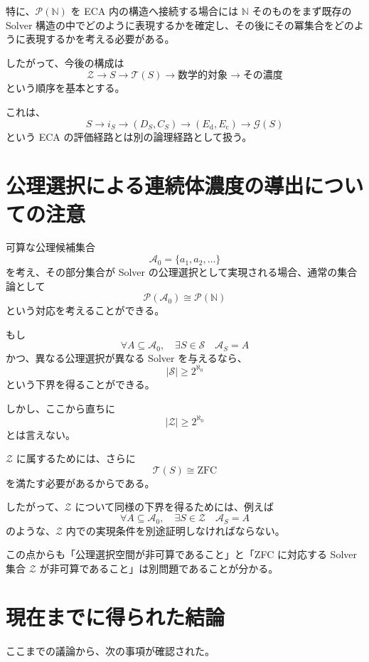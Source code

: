 \documentclass[a4paper,11pt]{article}
\begin{document}
特に、$\mathcal{P}(\mathbb{N})$ を ECA 内の構造へ接続する場合には $\mathbb{N}$ そのものをまず既存の Solver 構造の中でどのように表現するかを確定し、その後にその冪集合をどのように表現するかを考える必要がある。

したがって、今後の構成は
\[
\boxed{
\mathcal{Z}
\longrightarrow
S
\longrightarrow
\mathcal{T}(S)
\longrightarrow
\text{数学的対象}
\longrightarrow
\text{その濃度}
}
\]
という順序を基本とする。

これは、
\[
S
\longrightarrow
i_S
\longrightarrow
(D_S,C_S)
\longrightarrow
(E_{\mathrm d},E_{\mathrm c})
\longrightarrow
\mathcal{G}(S)
\]
という ECA の評価経路とは別の論理経路として扱う。

\section{公理選択による連続体濃度の導出についての注意}

可算な公理候補集合
\[
\mathcal{A}_0=\{a_1,a_2,\ldots\}
\]
を考え、その部分集合が Solver の公理選択として実現される場合、通常の集合論として
\[
\mathcal{P}(\mathcal{A}_0)
\cong
\mathcal{P}(\mathbb{N})
\]
という対応を考えることができる。

もし
\[
\forall A\subseteq\mathcal{A}_0,\quad
\exists S\in\mathcal{S}
\quad
\mathcal{A}_S=A
\]
かつ、異なる公理選択が異なる Solver を与えるなら、
\[
|\mathcal{S}|
\geq
2^{\aleph_0}
\]
という下界を得ることができる。

しかし、ここから直ちに
\[
|\mathcal{Z}|
\geq
2^{\aleph_0}
\]
とは言えない。

$\mathcal{Z}$ に属するためには、さらに
\[
\mathcal{T}(S)\cong\mathrm{ZFC}
\]
を満たす必要があるからである。

したがって、$\mathcal{Z}$ について同様の下界を得るためには、例えば
\[
\boxed{
\forall A\subseteq\mathcal{A}_0,\quad
\exists S\in\mathcal{Z}
\quad
\mathcal{A}_S=A
}
\]
のような、$\mathcal{Z}$ 内での実現条件を別途証明しなければならない。

この点からも「公理選択空間が非可算であること」と「ZFC に対応する Solver 集合 $\mathcal{Z}$ が非可算であること」は別問題であることが分かる。

\section{現在までに得られた結論}

ここまでの議論から、次の事項が確認された。
\end{document}
